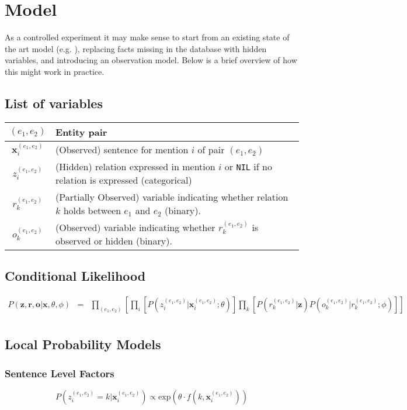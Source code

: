\documentclass[12pt]{article}
\begin{document}
\section{Model}
As a controlled experiment it may make sense to start from an existing state of the art model (e.g. \cite{Hoffmann11}), replacing
facts missing in the database with hidden variables, and introducing an observation model.  Below is a brief overview of how this might work in practice.

\subsection{List of variables}
\begin{center}
\begin{tabular}{|c|p{4in}|}
\hline
$(e_1,e_2)$ & Entity pair \\
\hline
$\mathbf{x}^{(e_1,e_2)}_i$ & (Observed) sentence for mention $i$ of pair $(e_1,e_2)$ \\
\hline
$z^{(e_1,e_2)}_i$ & (Hidden) relation expressed in mention $i$ or {\tt NIL} if no relation is expressed (categorical) \\
\hline
$r^{(e_1,e_2)}_k$ & (Partially Observed) variable indicating whether relation $k$ holds between $e_1$ and $e_2$ (binary). \\
\hline
$o^{(e_1,e_2)}_k$ & (Observed) variable indicating whether $r^{(e_1,e_2)}_k$ is observed or hidden (binary). \\
\hline
\end{tabular}
\end{center}

\subsection{Conditional Likelihood}
\label{conditional_likelihood}
\begin{eqnarray*}
  P(\mathbf{z}, \mathbf{r}, \mathbf{o}|\mathbf{x},\theta,\phi) & = & \prod_{(e_1,e_2)} \left[ \prod_i \left[ P(z^{(e_1,e_2)}_i|\mathbf{x}^{(e_1,e_2)}_i;\theta) \right] \prod_{k} \left[P(r^{(e_1,e_2)}_k|\mathbf{z}) P(o^{(e_1,e_2)}_k|r^{(e_1,e_2)}_k;\phi) \right] \right]\\
\end{eqnarray*}

\subsection{Local Probability Models}
\subsubsection{Sentence Level Factors}
\[
P(z^{(e_1,e_2)}_i=k|\mathbf{x}^{(e_1,e_2)}_i) \propto \text{exp}\left(\theta \cdot f(k,\mathbf{x}^{(e_1,e_2)}_i)\right)
\]
\end{document}
